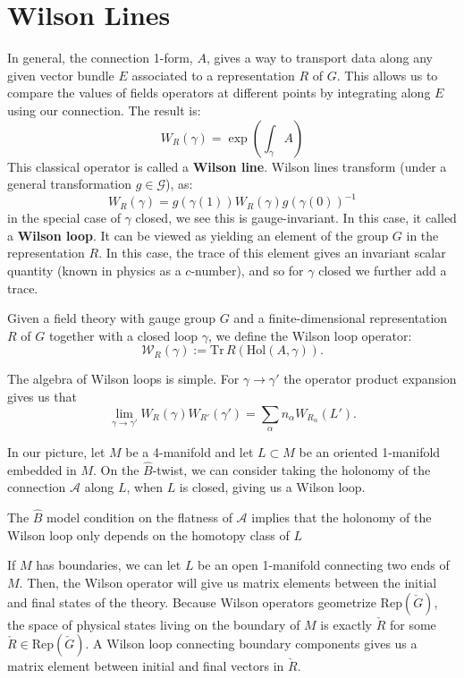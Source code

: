 	

\section{Wilson Lines} %
\label{sec:wilson_lines}

	In general, the connection 1-form, $A$, gives a way to transport data along any given vector bundle $E$ associated to a representation $R$ of $G$. This allows us to compare the values of fields operators at different points by integrating along $E$ using our connection. The result is: 
	\begin{equation}
		W_R (\gamma) = \exp\left(\int_\gamma A \right)
	\end{equation}
	This classical operator is called a \textbf{Wilson line}.
	Wilson lines transform (under a general transformation $g \in \mathcal G$), as:
	\begin{equation}
		W_R(\gamma) = g(\gamma(1)) W_R(\gamma)  g(\gamma(0))^{-1}
	\end{equation}
	in the special case of $\gamma$ closed, we see this is gauge-invariant. In this case, it called a \textbf{Wilson loop}. It can be viewed as yielding an element of the group $G$ in the representation $R$. In this case, the trace of this element gives an invariant scalar quantity (known in physics as a $c$-number), and so for $\gamma$ closed we further add a trace.
	\begin{defn}
		Given a field theory with gauge group $G$ and a finite-dimensional representation $R$ of $G$ together with a closed loop $\gamma$, we define the Wilson loop operator:
		\begin{equation}
			\mathcal W_{R}(\gamma) := \mathrm{Tr}\, R( \mathrm{Hol}(A, \gamma)).
		\end{equation}
	\end{defn}
\noindent	The algebra of Wilson loops is simple. For $\gamma \to \gamma'$ the operator product expansion gives us that
	\begin{equation}
		\lim_{\gamma \to \gamma'} W_R (\gamma) W_{R'} (\gamma') = \sum_\alpha n_\alpha W_{R_\alpha}(L').
	\end{equation}

	In our picture, let $M$ be a 4-manifold and let $L \subset M$ be an oriented 1-manifold embedded in $M$. On the $\hat B$-twist, we can consider taking the holonomy of the connection $\mathcal A$ along $L$, when $L$ is closed, giving us a Wilson loop. 
	\begin{prop}
		The $\hat B$ model condition on the flatness of $\mathcal A$ implies that the holonomy of the Wilson loop only depends on the homotopy class of $L$
	\end{prop}
	If $M$ has boundaries, we can let $L$ be an open 1-manifold connecting two ends of $M$. Then, the Wilson operator will give us matrix elements between the initial and final states of the theory. Because Wilson operators geometrize $\mathrm{Rep}(\check G)$, the space of physical states living on the boundary of $M$ is exactly $\check R$ for some $\check R \in \mathrm{Rep}(\check G)$. A Wilson loop connecting boundary components gives us a matrix element between initial and final vectors in $\check R$.
	
